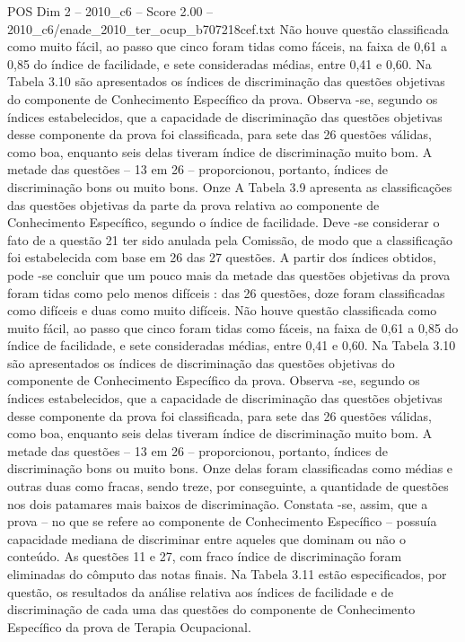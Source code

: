 \begin{textsample}{POS Dim 2 – 2010\_c6 – Score 2.00 – 2010\_c6/enade\_2010\_ter\_ocup\_b707218cef.txt}
Não houve questão classificada como muito fácil, ao passo que cinco foram tidas como fáceis, na faixa de 0,61 a 0,85 do índice de facilidade, e sete consideradas médias, entre 0,41 e 0,60.
Na Tabela 3.10 são apresentados os índices de discriminação das questões objetivas do componente de Conhecimento Específico da prova.
Observa -se, segundo os índices estabelecidos, que a capacidade de discriminação das questões objetivas desse componente da prova foi classificada, para sete das 26 questões válidas, como boa, enquanto seis delas tiveram índice de discriminação muito bom.
A metade das questões – 13 em 26 – proporcionou, portanto, índices de discriminação bons ou muito bons.
Onze A Tabela 3.9 apresenta as classificações das questões objetivas da parte da prova relativa ao componente de Conhecimento Específico, segundo o índice de facilidade.
Deve -se considerar o fato de a questão 21 ter sido anulada pela Comissão, de modo que a classificação foi estabelecida com base em 26 das 27 questões.
A partir dos índices obtidos, pode -se concluir que um pouco mais da metade das questões objetivas da prova foram tidas como pelo menos difíceis : das 26 questões, doze foram classificadas como difíceis e duas como muito difíceis.
Não houve questão classificada como muito fácil, ao passo que cinco foram tidas como fáceis, na faixa de 0,61 a 0,85 do índice de facilidade, e sete consideradas médias, entre 0,41 e 0,60.
Na Tabela 3.10 são apresentados os índices de discriminação das questões objetivas do componente de Conhecimento Específico da prova.
Observa -se, segundo os índices estabelecidos, que a capacidade de discriminação das questões objetivas desse componente da prova foi classificada, para sete das 26 questões válidas, como boa, enquanto seis delas tiveram índice de discriminação muito bom.
A metade das questões – 13 em 26 – proporcionou, portanto, índices de discriminação bons ou muito bons.
Onze delas foram classificadas como médias e outras duas como fracas, sendo treze, por conseguinte, a quantidade de questões nos dois patamares mais baixos de discriminação.
Constata -se, assim, que a prova – no que se refere ao componente de Conhecimento Específico – possuía capacidade mediana de discriminar entre aqueles que dominam ou não o conteúdo.
As questões 11 e 27, com fraco índice de discriminação foram eliminadas do cômputo das notas finais.
Na Tabela 3.11 estão especificados, por questão, os resultados da análise relativa aos índices de facilidade e de discriminação de cada uma das questões do componente de Conhecimento Específico da prova de Terapia Ocupacional.

\end{textsample}
